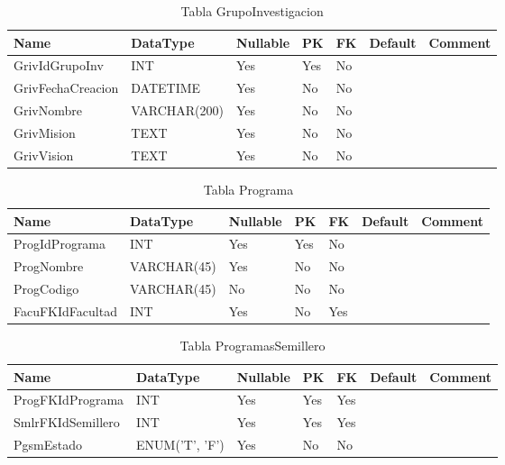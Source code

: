 \begin{table}
	\caption{Tabla GrupoInvestigacion}
	\label{labelTableGrupoInvestigacion}
	\begin{tabular}{ |l|l|l|l|l|l|l| }
		\hline
		Name & DataType & Nullable & PK & FK & Default & Comment \\ \hline
		GrivIdGrupoInv & INT & Yes & Yes & No &  & \\ \hline 
		GrivFechaCreacion & DATETIME & Yes & No & No &  & \\ \hline 
		GrivNombre & VARCHAR(200) & Yes & No & No &  & \\ \hline 
		GrivMision & TEXT & Yes & No & No &  & \\ \hline 
		GrivVision & TEXT & Yes & No & No &  & \\ \hline 
		
	\end{tabular}
\end{table}


\begin{table}
	\caption{Tabla Programa}
	\label{labelTablePrograma}
	\begin{tabular}{ |l|l|l|l|l|l|l| }
		\hline
		Name & DataType & Nullable & PK & FK & Default & Comment \\ \hline
		ProgIdPrograma & INT & Yes & Yes & No &  & \\ \hline 
		ProgNombre & VARCHAR(45) & Yes & No & No &  & \\ \hline 
		ProgCodigo & VARCHAR(45) & No & No & No &  & \\ \hline 
		FacuFKIdFacultad & INT & Yes & No & Yes &  & \\ \hline 
		
	\end{tabular}
\end{table}


\begin{table}
	\caption{Tabla ProgramasSemillero}
	\label{labelTableProgramasSemillero}
	\begin{tabular}{ |l|l|l|l|l|l|l| }
		\hline
		Name & DataType & Nullable & PK & FK & Default & Comment \\ \hline
		ProgFKIdPrograma & INT & Yes & Yes & Yes &  & \\ \hline 
		SmlrFKIdSemillero & INT & Yes & Yes & Yes &  & \\ \hline 
		PgsmEstado & ENUM('T', 'F') & Yes & No & No &  & \\ \hline 
		
	\end{tabular}
\end{table}



